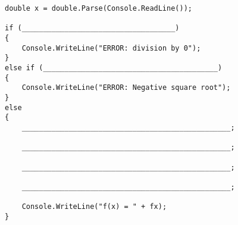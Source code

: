 ﻿\documentclass[14pt]{extarticle}
\begin{document}
\begin{boxCode}
\begin{english}
\begin{verbatim}
double x = double.Parse(Console.ReadLine());

if (____________________________________)
{
    Console.WriteLine("ERROR: division by 0");
}
else if (_________________________________________)
{
    Console.WriteLine("ERROR: Negative square root");
}
else
{
    _________________________________________________;

    _________________________________________________;

    _________________________________________________;

    _________________________________________________;

    Console.WriteLine("f(x) = " + fx);
}
\end{verbatim}
\end{english}
\end{boxCode}

\fi
\end{document}
